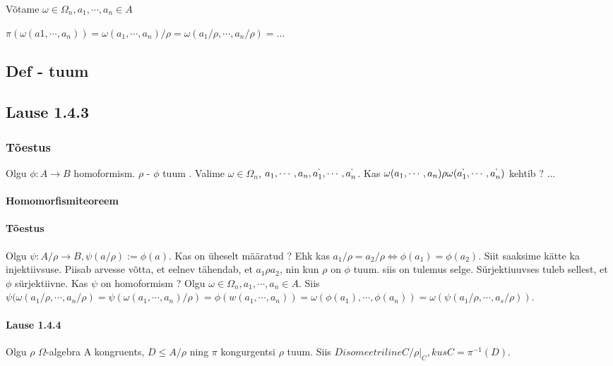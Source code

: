 \documentclass[12pt]{article}
\begin{document}
Võtame $\omega \in \Omega_n, a_1,\cdots,a_n \in A$

$\pi(\omega(a1,\cdots,a_n)) = \omega(a_1,\cdots,a_n)/\rho = \omega( a_1 / \rho, \cdots , a_n / \rho) = ...$

\subsection{Def - tuum}


\subsection{Lause 1.4.3}

\subsubsection*{Tõestus}
Olgu $\phi : A \rightarrow B$ homoformism. $\rho$ - $\phi $ tuum . 
Valime $\omega \in \Omega_n$, $a_1,\cdots,a_n,a_1^{`},\cdots,a_n^{`}$. Kas $\omega(a_1,\cdots ,a_n) \rho \omega(a_1^{`},\cdots ,a_n^{`})$ kehtib ? ...

\paragraph{Homomorfismiteoreem}

\paragraph*{Tõestus}
Olgu $\psi : A/ \rho \rightarrow B, \psi(a / \rho) := \phi(a)$. Kas on \"uheselt määratud ? Ehk kas $a_1/ \rho = a_2 / \rho \iff \phi(a_1) = \phi (a_2)$. Siit saaksime kätte ka injektiivsuse. Piisab arvesse võtta, et eelnev tähendab, et $a_1 \rho a_2$, nin kun $\rho$ on $\phi$ tuum. siis on tulemus selge. Sürjektiuuvses tuleb sellest, et $\phi$ sürjektiivne. 
Kas $\psi$ on homoformism ?
Olgu $\omega \in \Omega_n, a_1, \cdots, a_n \in A$.
Siis  $\psi(\omega(a_1 / \rho, \cdots, a_n / \rho) = \psi (\omega(a_1, \cdots, a_n) / \rho) = \phi(w(a_1,\cdots,a_n)) = \omega(\phi(a_1),\cdots, \phi(a_n)) = \omega(\psi(a_1 / \rho, \cdots, a_s / \rho)).$

\paragraph{Lause 1.4.4} Olgu $\rho$ $\Omega $-algebra A kongruents, $D \leq A / \rho$ ning $\pi $ kongurgentsi $\rho $ tuum. Siis $D isomeetriline C / \rho|_C , kus C = \pi^{-1}(D) $.
\end{document}
